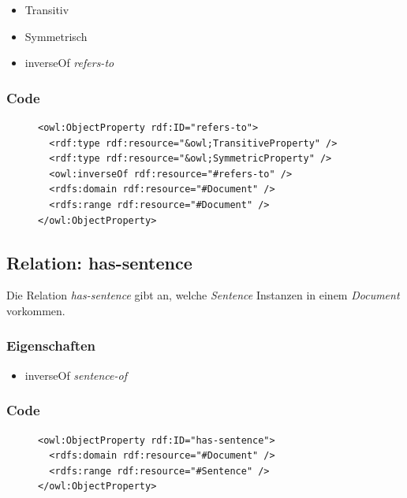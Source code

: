 \documentclass[
    11pt,
    latin1,
    a4paper,
    oneside
]{scrreprt}
\begin{document}
\begin{itemize}
  \item Transitiv
  \item Symmetrisch
  \item inverseOf \emph{refers-to}
\end{itemize}

\subsubsection{Code} \label{sec:rel_refersto_code}

\begin{figure}[H]
 \lstset{language=XML}
 \begin{lstlisting}[label=owl:refersto,caption={Die Relation \emph{refers-to} beschreibt die Abh\"angigkeiten unter Dokumenten}]
<owl:ObjectProperty rdf:ID="refers-to">
  <rdf:type rdf:resource="&owl;TransitiveProperty" />
  <rdf:type rdf:resource="&owl;SymmetricProperty" />
  <owl:inverseOf rdf:resource="#refers-to" />
  <rdfs:domain rdf:resource="#Document" />
  <rdfs:range rdf:resource="#Document" />
</owl:ObjectProperty>
 \end{lstlisting}
\end{figure}


\subsection{Relation: has-sentence} \label{sec:rel_hassentence}

Die Relation \emph{has-sentence} gibt an, welche \emph{Sentence} Instanzen in einem \emph{Document} vorkommen.

\subsubsection{Eigenschaften} \label{sec:rel_hassentence_settings}

\begin{itemize}
  \item inverseOf \emph{sentence-of}
\end{itemize}

\subsubsection{Code} \label{sec:rel_hassentence_code}

\begin{figure}[H]
 \lstset{language=XML}
 \begin{lstlisting}[label=owl:hassentence,caption={Die Relation \emph{has-sentence} gibt an, welches Dokuemnt aus welchen S\"atzen besteht}]
<owl:ObjectProperty rdf:ID="has-sentence">
  <rdfs:domain rdf:resource="#Document" />
  <rdfs:range rdf:resource="#Sentence" />
</owl:ObjectProperty>
 \end{lstlisting}
\end{figure}
\end{document}
